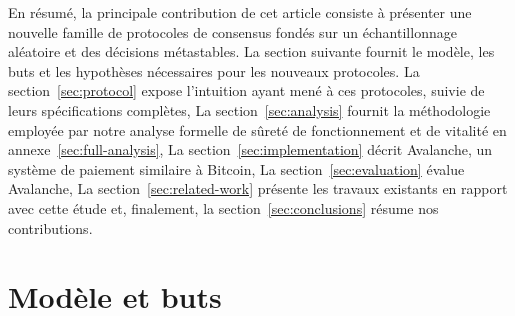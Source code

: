\documentclass[a4,twocolumn,10pt]{article}
\newcommand{\editchange}[1]{{\color{orange}#1}}
\theoremstyle{definition}
\begin{document}
En résumé, la principale contribution de cet article consiste à présenter une nouvelle famille de protocoles de consensus fondés sur un échantillonnage aléatoire et des décisions métastables.
La section suivante fournit le modèle, les buts et les hypothèses nécessaires pour les nouveaux protocoles.
La section~\ref{sec:protocol} expose l'intuition ayant mené à ces protocoles, suivie de leurs spécifications complètes,
La section~\ref{sec:analysis} fournit la méthodologie employée par notre analyse formelle de sûreté de fonctionnement et de vitalité en annexe~\ref{sec:full-analysis},
La section~\ref{sec:implementation} décrit Avalanche, un système de paiement similaire à Bitcoin,
La section~\ref{sec:evaluation} évalue Avalanche,
La section~\ref{sec:related-work} présente les travaux existants en rapport avec cette étude et, finalement, la section~\ref{sec:conclusions} résume nos contributions.

\section{Modèle et buts}
\label{sec:model_and_goals}
\end{document}
